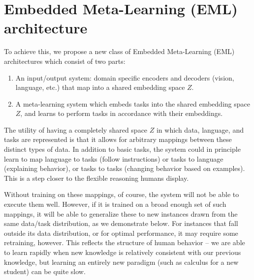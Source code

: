 \documentclass{article}
\begin{document}
\section{Embedded Meta-Learning (EML) architecture}
To achieve this, we propose a new class of Embedded Meta-Learning (EML) architectures which consist of two parts: 
\vspace{-0.75em}
\begin{enumerate} \setlength \itemsep{0em}
\item An input/output system: domain specific encoders and decoders (vision, language, etc.) that map into a shared embedding space $Z$.
\item A meta-learning system which embeds tasks into the shared embedding space $Z$, and learns to perform tasks in accordance with their embeddings.
\end{enumerate}
\vspace{-0.75em}
The utility of having a completely shared space $Z$ in which data, language, and tasks are represented is that it allows for arbitrary mappings between these distinct types of data. In addition to basic tasks, the system could in principle learn to map language to tasks (follow instructions) or tasks to language (explaining behavior), or tasks to tasks (changing behavior based on examples). This is a step closer to the flexible reasoning humans display. \par
Without training on these mappings, of course, the system will not be able to execute them well. However, if it is trained on a broad enough set of such mappings, it will be able to generalize these to new instances drawn from the same data/task distribution, as we demonstrate below. For instances that fall outside its data distribution, or for optimal performance, it may require some retraining, however. This reflects the structure of human behavior -- we are able to learn rapidly when new knowledge is relatively consistent with our previous knowledge, but learning an entirely new paradigm (such as calculus for a new student) can be quite slow. \par 
\end{document}
